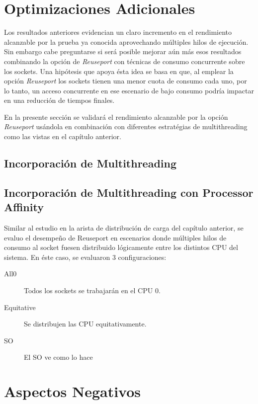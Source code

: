 \section{Optimizaciones Adicionales}
Los resultados anteriores evidencian un claro incremento en el rendimiento alcanzable por la prueba ya conocida aprovechando múltiples hilos de ejecución. Sin embargo cabe preguntarse si será posible mejorar aún más esos resultados combinando la opción de \emph{Reuseport} con técnicas de consumo concurrente sobre los sockets. Una hipótesis que apoya ésta idea se basa en que, al emplear la opción \emph{Reuseport} los sockets tienen una menor cuota de consumo cada uno, por lo tanto, un acceso concurrente en ese escenario de bajo consumo podría impactar en una reducción de tiempos finales.

En la presente sección se validará el rendimiento alcanzable por la opción \emph{Reuseport} usándola en combinación con diferentes estratégias de multithreading como las vistas en el capítulo anterior.

\subsection{Incorporación de Multithreading}

\subsection{Incorporación de Multithreading con Processor Affinity}
Similar al estudio en la arista de distribución de carga del capítulo anterior, se evaluo el desempeño de Reuseport en escenarios donde múltiples hilos de consumo al socket fuesen distribuido lógicamente entre los distintos CPU del sistema. En éste caso, se evaluaron 3 configuraciones:

\begin{description}
\item[All0] Todos los sockets se trabajarán en el CPU 0.
\item[Equitative] Se distribujen las CPU equitativamente.
\item[SO] El SO ve como lo hace
\end{description}


\section{Aspectos Negativos}

